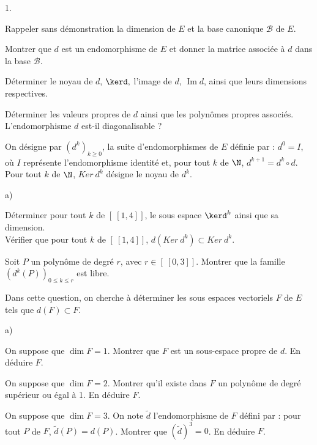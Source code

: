 \documentclass[11pt]{article}%
\begin{document}
\begin{noliste}{1.}
 \setlength{\itemsep}{4mm}
\item Rappeler sans démonstration la dimension de $E$ et la base
canonique $\mathcal{B}$ de $E$.

\item Montrer que $d$ est un endomorphisme de $E$ et donner la matrice
associée à $d$ dans la base $\mathcal{B}$.

\item Déterminer le noyau de $d$, $\kerd,$ l'image de $d$,
$\operatorname{Im}d$,
ainsi que leurs dimensions respectives.

\item Déterminer les valeurs propres de $d$ ainsi que les polyn\^{o}mes
propres associés. L'endomorphisme $d$ est-il diagonalisable ?

On désigne par $\left( d^{k}\right)_{k\geq0}$, la suite
d'endomorphismes de $E$ définie par : $d^{0} = I$, où $I$ représente
l'endomorphisme identité et, pour tout $k$ de $\N$, $d^{k + 1} =
d^{k}\circ d$. Pour tout $k$ de $\N$, $Ker~d^{k}$ désigne le noyau de
$d^{k}$.

\item 

\begin{noliste}{a)}
 \setlength{\itemsep}{2mm}
\item Déterminer pour tout $k$ de $\left[ \ \left[ 1,4\right] \right]
$,
le sous espace $\kerd^{k}$ ainsi que sa dimension.\\
Vérifier que pour tout $k$ de $\left[ \ \left[ 1,4\right] \right] $,
$d\left( Ker~d^{k}\right) \subset Ker~d^{k}$.

\item Soit $P$ un polyn\^{o}me de degré $r$, avec $r\in\left[ \ \left[
0,3\right] \right] $. Montrer que la famille $\left( d^{k}\left(
P\right)
\right)_{0\leq k\leq r}$ est libre.
\end{noliste}

\item Dans cette question, on cherche à déterminer les sous espaces
vectoriels $F$ de $E$ tels que $d\left( F\right) \subset F$.

\begin{noliste}{a)}
 \setlength{\itemsep}{2mm}
\item On suppose que $\dim F = 1$. Montrer que $F$ est un sous-espace
propre
de $d$. En déduire $F$.

\item On suppose que $\dim F = 2$. Montrer qu'il existe dans $F$ un
polyn\^{o}me de degré supérieur ou égal à 1. En déduire $F$.

\item On suppose que $\dim F = 3$. On note $\tilde{d}$ l'endomorphisme
de $F$ défini par : pour tout $P$ de $F$, $\tilde{d}\left( P\right) =
d\left(
P\right) $. Montrer que $\left( \tilde{d}\right) ^{3} = 0$. En déduire
$F$.
\end{noliste}
\end{noliste}
\end{document}
